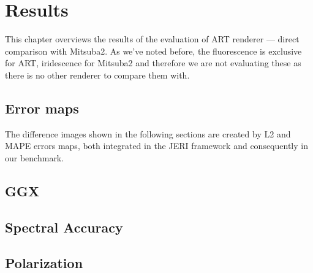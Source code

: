 \chapter{Results}
\label{chap:results}

This chapter overviews the results of the evaluation of ART renderer --- direct comparison with Mitsuba2. As we've noted before, the fluorescence is exclusive for ART, iridescence for Mitsuba2 and therefore we are not evaluating these as there is no other renderer to compare them with.

\section{Error maps}
The difference images shown in the following sections are created by L2 and MAPE errors maps, both integrated in the JERI framework and consequently in our benchmark.


\section{GGX}

\section{Spectral Accuracy}

\section{Polarization}